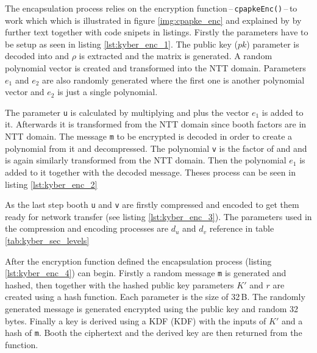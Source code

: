 The encapsulation process relies on the encryption function\,--\,\texttt{cpapkeEnc()}\,--\,to work which which is illustrated in figure \ref{img:cpapke_enc} and explained by by further text together with code snipets in listings. Firstly the parameters have to be setup as seen in listing \ref{lst:kyber_enc_1}. The public key ($pk$) parameter is decoded into  and $\rho$ is extracted and the matrix  is generated. A random polynomial vector  is created and transformed into the NTT domain. Parameters $e_1$ and $e_2$ are also randomly generated where the first one is another polynomial vector and $e_2$ is just a single polynomial.

The parameter \texttt{u} is calculated by multiplying  and  plus the vector $e_1$ is added to it. Afterwards it is transformed from the NTT domain since booth factors are in NTT domain. The message \texttt{m} to be encrypted is decoded in order to create a polynomial from it and decompressed. The polynomial \texttt{v} is the factor of  and  and is again similarly transformed from the NTT domain. Then the polynomial $e_1$ is added to it together with the decoded message. Theses process can be seen in listing \ref{lst:kyber_enc_2}

As the last step booth \texttt{u} and \texttt{v} are firstly compressed and encoded to get them ready for network transfer (see listing \ref{lst:kyber_enc_3}). The parameters used in the compression and encoding processes are $d_u$ and $d_v$ reference in table \ref{tab:kyber_sec_levels}

\newpage
{}

After the encryption function defined the encapsulation process (listing \ref{lst:kyber_enc_4}) can begin. Firstly a random message \texttt{m} is generated and hashed, then together with the hashed public key parameters $K'$ and $r$ are created using a hash function. Each parameter is the size of 32\,B. The randomly generated message is generated encrypted using the public key and random 32 bytes. Finally a key is derived using a KDF (\acl{KDF}) with the inputs of $K'$ and a hash of \texttt{m}. Booth the ciphertext and the derived key are then returned from the function.
\newpage
{}
